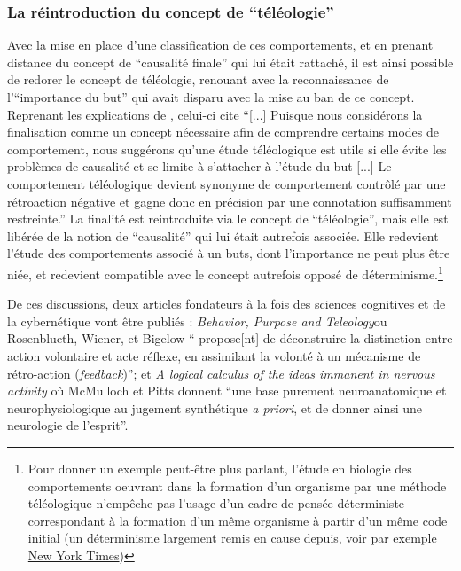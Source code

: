 
\subsubsection{La réintroduction du concept de \enquote{téléologie}}

Avec la mise en place d'une classification de ces comportements, et en prenant distance du concept de \enquote{causalité finale} qui lui était rattaché, il est ainsi possible de redorer le concept de téléologie, renouant avec la reconnaissance de l'\enquote{importance du but} qui avait disparu avec la mise au ban de ce concept. Reprenant les explications de \autocite[776]{Pouvreau2013}, celui-ci cite \autocite[23-24]{Rosenblueth1943} \enquote{[...] Puisque nous considérons la finalisation comme un concept nécessaire afin de comprendre certains modes de comportement, nous suggérons qu'une étude téléologique est utile si elle évite les problèmes de causalité et se limite à s'attacher à l'étude du but [...] Le comportement téléologique devient synonyme de comportement contrôlé par une rétroaction négative et gagne donc en précision par une connotation suffisamment restreinte.} La finalité est reintroduite via le concept de \enquote{téléologie}, mais elle est libérée de la notion de \enquote{causalité} qui lui était autrefois associée. Elle redevient l'étude des comportements associé à un buts, dont l'importance ne peut plus être niée, et redevient compatible avec le concept autrefois opposé de déterminisme.\footnote{Pour donner un exemple peut-être plus parlant, l'étude en biologie des comportements oeuvrant dans la formation d'un organisme par une méthode téléologique n'empêche pas l'usage d'un cadre de pensée déterministe  correspondant à la formation d'un même organisme à partir d'un même code initial (un déterminisme largement remis en cause depuis, voir par exemple \href{http://www.nytimes.com/2014/01/21/science/seeing-x-chromosomes-in-a-new-light.html?ref=science&_r=0}{New York Times})}

De ces discussions, deux articles fondateurs à la fois des sciences cognitives \autocite[23]{Dupuy2000} et de la cybernétique vont être publiés : \textit{Behavior, Purpose and Teleology}ou Rosenblueth, Wiener, et Bigelow \enquote{ propose[nt] de déconstruire la distinction entre action volontaire et acte réflexe, en assimilant la volonté à un mécanisme de rétro-action (\textit{feedback})}; et \textit{A logical calculus of the ideas immanent in nervous activity} où McMulloch et Pitts donnent \enquote{une base purement neuroanatomique et neurophysiologique au jugement synthétique \textit{a priori}, et de donner ainsi une neurologie de l'esprit}.

